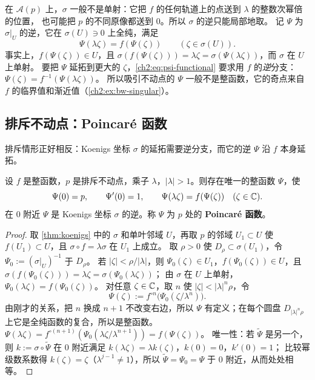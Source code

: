 在 $\mathcal A(p)$ 上，$\sigma$ 一般不是单射：它把 $f$ 的任何轨道上的点送到 $\lambda$ 的整数次幂倍的位置，
也可能把 $p$ 的不同原像都送到 $0$。所以 $\sigma$ 的逆只能局部地取。
记 $\Psi$ 为 $\sigma|_U$ 的逆，它在 $\sigma(U)\ni0$ 上全纯，满足
\begin{equation}\label{ch2:eq:psi-functional}
  \Psi(\lambda\zeta)=f(\Psi(\zeta))\qquad(\zeta\in\sigma(U)).
\end{equation}
事实上，$f(\Psi(\zeta))\in U$，且 $\sigma(f(\Psi(\zeta)))=\lambda\zeta=\sigma(\Psi(\lambda\zeta))$，而 $\sigma$ 在 $U$ 上单射。
要把 $\Psi$ 延拓到更大的 $\zeta$，\eqref{ch2:eq:psi-functional} 要求用 $f$ 的\emph{逆}分支：$\Psi(\zeta)=f^{-1}(\Psi(\lambda\zeta))$。
所以吸引不动点的 $\Psi$ 一般不是整函数，它的奇点来自 $f$ 的临界值和渐近值（\cref{ch2:ex:bw-singular}）。

\subsection{排斥不动点：Poincaré 函数}

排斥情形正好相反：Koenigs 坐标 $\sigma$ 的延拓需要逆分支，而它的逆 $\Psi$ 沿 $f$ 本身延拓。

\begin{proposition}[Poincaré 函数]\label{ch2:prop:poincare}
设 $f$ 是整函数，$p$ 是排斥不动点，乘子 $\lambda$，$|\lambda|>1$。则存在唯一的整函数 $\Psi$，使
\[
  \Psi(0)=p,\qquad\Psi'(0)=1,\qquad\Psi(\lambda\zeta)=f(\Psi(\zeta))\quad(\zeta\in\mathbb{C}).
\]
在 $0$ 附近 $\Psi$ 是 Koenigs 坐标 $\sigma$ 的逆。称 $\Psi$ 为 $p$ 处的 \textbf{Poincaré 函数}。
\end{proposition}

\begin{proof}
取 \cref{thm:koenigs} 中的 $\sigma$ 和单叶邻域 $U$，再取 $p$ 的邻域 $U_1\subset U$ 使 $f(U_1)\subset U$，且 $\sigma\circ f=\lambda\sigma$ 在 $U_1$ 上成立。
取 $\rho>0$ 使 $D_\rho\subset\sigma(U_1)$，令 $\Psi_0:=(\sigma|_U)^{-1}$ 于 $D_\rho$。
若 $|\zeta|<\rho/|\lambda|$，则 $\Psi_0(\zeta)\in U_1$，$f(\Psi_0(\zeta))\in U$，且 $\sigma(f(\Psi_0(\zeta)))=\lambda\zeta=\sigma(\Psi_0(\lambda\zeta))$；
由 $\sigma$ 在 $U$ 上单射，$\Psi_0(\lambda\zeta)=f(\Psi_0(\zeta))$。
对任意 $\zeta\in\mathbb{C}$，取 $n$ 使 $|\zeta|<|\lambda|^n\rho$，令
\[
  \Psi(\zeta):=f^{\circ n}\bigl(\Psi_0(\zeta/\lambda^n)\bigr).
\]
由刚才的关系，把 $n$ 换成 $n+1$ 不改变右边，所以 $\Psi$ 有定义；在每个圆盘 $D_{|\lambda|^n\rho}$ 上它是全纯函数的复合，所以是整函数。
$\Psi(\lambda\zeta)=f^{\circ(n+1)}(\Psi_0(\lambda\zeta/\lambda^{n+1}))=f(\Psi(\zeta))$。
唯一性：若 $\tilde\Psi$ 是另一个，则 $k:=\sigma\circ\tilde\Psi$ 在 $0$ 附近满足 $k(\lambda\zeta)=\lambda k(\zeta)$，$k(0)=0$，$k'(0)=1$；
比较幂级数系数得 $k(\zeta)=\zeta$（$\lambda^{j-1}\ne1$），所以 $\tilde\Psi=\Psi_0=\Psi$ 于 $0$ 附近，从而处处相等。
\end{proof}


